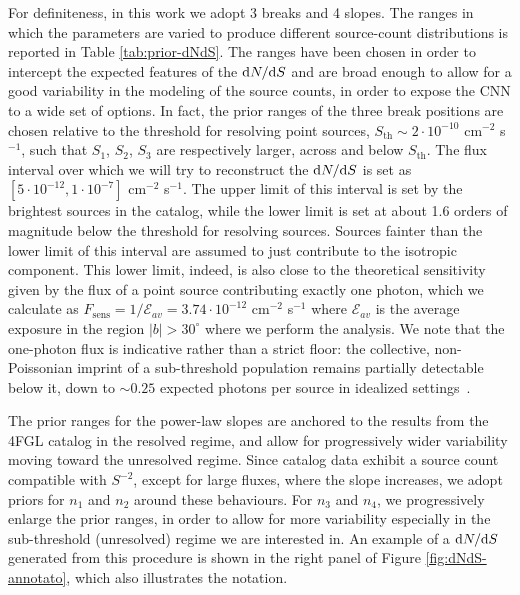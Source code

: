 For definiteness, in this work we adopt 3 breaks and 4 slopes. The ranges in which the parameters are varied to produce different source-count distributions is reported in Table \ref{tab:prior-dNdS}. The ranges have been chosen in order to intercept the expected features of the $\text{d}N/\text{d}S$ and are broad enough to allow for a good variability in the modeling of the source counts, in order to expose the CNN to a wide set of options. In fact, the prior ranges of the three break positions are chosen relative to the \fermi threshold for resolving point sources, $S_\textrm{th} \sim 2 \cdot 10^{-10}$ cm$^{-2}$ s$^{-1}$, such that $S_1$, $S_2$, $S_3$ are respectively larger, across and below $S_\textrm{th}$. The flux interval over which we will try to reconstruct the $\text{d}N/\text{d}S$ is set as $[5 \cdot 10^{-12}, 1 \cdot 10^{-7}]$ cm$^{-2}$ s$^{-1}$. The upper limit of this interval is set by the brightest sources in the catalog, while the lower limit is set at about 1.6 orders of magnitude below the \fermi threshold for resolving sources. Sources fainter than the lower limit of this interval are assumed to just contribute to the isotropic component.
{  This lower limit, indeed, is also close to the theoretical sensitivity given by the flux of a point source contributing exactly one photon, which we calculate as $F_\textrm{sens}= 1/\mathcal{E}_{av}=3.74 \cdot 10^{-12}$ cm$^{-2}$ s$^{-1}$  where $\mathcal{E}_{av}$ is the average exposure in the region $|b|>30^\circ$ where we perform the analysis.}
We note that the one-photon flux is indicative rather than a strict floor: the collective, non-Poissonian imprint of a sub-threshold population remains partially detectable below it, down to $\sim 0.25$ expected photons per source in idealized settings~\cite{List:2021aer}.





The prior ranges for the power-law slopes are anchored to the results from the 4FGL catalog in the resolved regime, and allow for progressively wider variability moving toward the unresolved regime. Since catalog data exhibit a source count compatible with $S^{-2}$, except for large fluxes, where the slope increases, we adopt priors for $n_1$ and $n_2$ around these behaviours. For $n_3$ and $n_4$, we progressively enlarge the prior ranges, in order to allow for more variability especially in the sub-threshold (unresolved) regime we are interested in. An example of a $\text{d}N/\text{d}S$ generated from this procedure is shown in the right panel of Figure \ref{fig:dNdS-annotato}, which also illustrates the notation.

